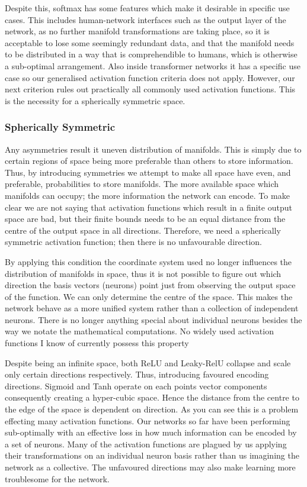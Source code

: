 \documentclass[onecolumn]{article}
\begin{document}
    Despite this, softmax has some features which make it desirable in specific use cases. This includes human-network interfaces such as the output layer of the network, as no further manifold transformations are taking place, so it is acceptable to lose some seemingly redundant data, and that the manifold needs to be distributed in a way that is comprehendible to humans, which is otherwise a sub-optimal arrangement. Also inside transformer networks it has a specific use case so our generalised activation function criteria does not apply. However, our next criterion rules out practically all commonly used activation functions. This is the necessity for a spherically symmetric space.
    
    \subsubsection{Spherically Symmetric}
    
    Any asymmetries result it uneven distribution of manifolds. This is simply due to certain regions of space being more preferable than others to store information. Thus, by introducing symmetries we attempt to make all space have even, and preferable, probabilities to store manifolds. The more available space which manifolds can occupy; the more information the network can encode. To make clear we are not saying that activation functions which result in a finite output space are bad, but their finite bounds needs to be an equal distance from the centre of the output space in all directions. Therefore, we need a spherically symmetric activation function; then there is no unfavourable direction.

    By applying this condition the coordinate system used no longer influences the distribution of manifolds in space, thus it is not possible to figure out which direction the basis vectors (neurons) point just from observing the output space of the function. We can only determine the centre of the space. This makes the network behave as a more unified system rather than a collection of independent neurons. There is no longer anything special about individual neurons besides the way we notate the mathematical computations. No widely used activation functions I know of currently possess this property
        
    Despite being an infinite space, both ReLU and Leaky-RelU collapse and scale only certain directions respectively. Thus, introducing favoured encoding directions. Sigmoid and Tanh operate on each points vector components consequently creating a hyper-cubic space. Hence the distance from the centre to the edge of the space is dependent on direction. As you can see this is a problem effecting many activation functions. Our networks so far have been performing sub-optimally with an effective loss in how much information can be encoded by a set of neurons. Many of the activation functions are plagued by us applying their transformations on an individual neuron basis rather than us imagining the network as a collective. The unfavoured directions may also make learning more troublesome for the network.
\end{document}
